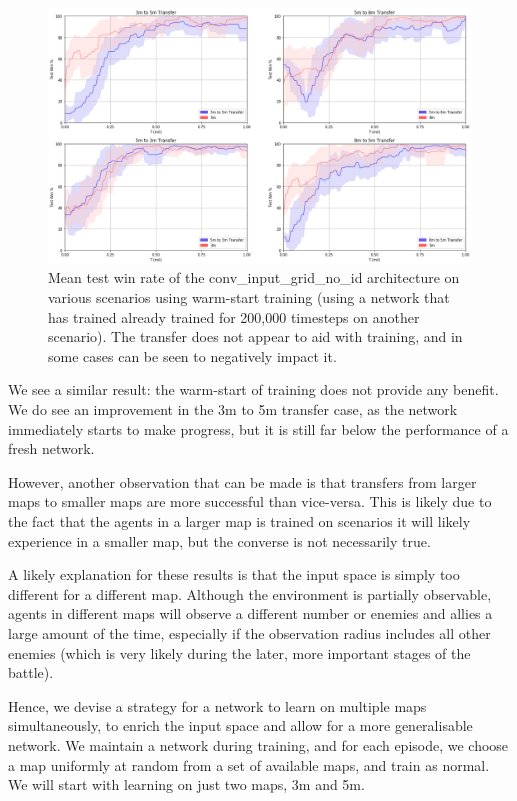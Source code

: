 \begin{figure}[h]
    \centering
    \hbox{\hspace{-5em}\includegraphics[width=1.2\textwidth]{images/graphs/2.png}}
    \caption{Mean test win rate of the conv\_input\_grid\_no\_id architecture on various scenarios using warm-start training (using a network that has trained already trained for 200,000 timesteps on another scenario). The transfer does not appear to aid with training, and in some cases can be seen to negatively impact it.}
    \label{fig:transfer2}
\end{figure}

We see a similar result: the warm-start of training does not provide any benefit. We do see an improvement in the 3m to 5m transfer case, as the network immediately starts to make progress, but it is still far below the performance of a fresh network.

However, another observation that can be made is that transfers from larger maps to smaller maps are more successful than vice-versa. This is likely due to the fact that the agents in a larger map is trained on scenarios it will likely experience in a smaller map, but the converse is not necessarily true.


A likely explanation for these results is that the input space is simply too different for a different map. Although the environment is partially observable, agents in different maps will observe a different number or enemies and allies a large amount of the time, especially if the observation radius includes all other enemies (which is very likely during the later, more important stages of the battle). 

Hence, we devise a strategy for a network to learn on multiple maps simultaneously, to enrich the input space and allow for a more generalisable network. We maintain a network during training, and for each episode, we choose a map uniformly at random from a set of available maps, and train as normal. We will start with learning on just two maps, 3m and 5m.

